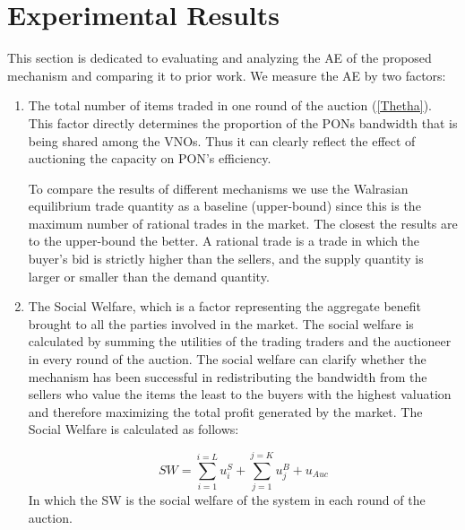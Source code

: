 

\section{Experimental Results} \label{results}
This section is dedicated to evaluating and analyzing the \ac{AE} of the proposed mechanism and comparing it to prior work. We measure the \ac{AE} by two factors:
\begin{enumerate}
\item The total number of items traded in one round of the auction (\autoref{Thetha}). This factor directly determines the proportion of the \acp{PON} bandwidth that is being shared among the VNOs. Thus it can clearly reflect the effect of auctioning the capacity on PON's efficiency.

To compare the results of different mechanisms we use the Walrasian equilibrium trade quantity as a baseline (upper-bound) since this is the maximum number of rational trades in the market. The closest the results are to the upper-bound the better. A rational trade is a trade in which the buyer's bid is strictly higher than the sellers, and the supply quantity is larger or smaller than the demand quantity.

\item The Social Welfare, which is a factor representing the aggregate benefit brought to all the parties involved in the market. The social welfare is calculated by summing the utilities of the trading traders and the auctioneer in every round of the auction. The social welfare can clarify whether the mechanism has been successful in redistributing the bandwidth from the sellers who value the items the least to the buyers with the highest valuation and therefore maximizing the total profit generated by the market. The Social Welfare is calculated as follows:

\begin{equation}
\label{SW:formula}
SW = \sum_{i=1}^{i=L} u^S_i + \sum_{j=1}^{j=K} u^B_j + u_{Auc}
\end{equation}
In which the SW is the social welfare of the system in each round of the auction.
\end{enumerate}


